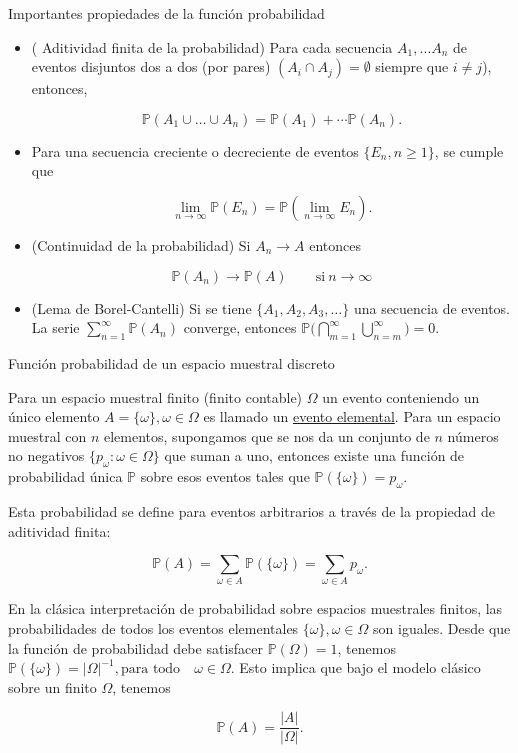 \documentclass{beamer}
\begin{document}
\begin{frame}{Importantes propiedades de la funci\'on  probabilidad}
	
	\begin{itemize}
\item \scriptsize{ ( Aditividad finita de la probabilidad) Para cada secuencia $A_1, \dots A_n$ de eventos disjuntos dos a dos (por pares) $(A_i \cap A_j) = \emptyset $ siempre que $i \neq j$), entonces,}


\[
\mathbb{P}(A_1 \cup \dots \cup A_n) = \mathbb{P}(A_1) + \cdots \mathbb{P}(A_n).
\]
\item \scriptsize{ Para una secuencia creciente o decreciente de eventos $\{E_n, n \geq 1 \}$, se cumple que}

\[
\lim_{n \rightarrow \infty}\mathbb{P}(E_n) = \mathbb{P}(\lim_{n \rightarrow \infty}E_n).
\]
\item \scriptsize{(Continuidad de la probabilidad) Si $A_n \rightarrow A $ entonces }

\[
\mathbb{P}(A_n) \rightarrow \mathbb{P}(A)  \qquad \mbox{si} \  n \rightarrow \infty
\]
\item \scriptsize{(Lema de Borel-Cantelli) Si se tiene  $\{ A_1, A_2, A_3, \dots \}$ una secuencia de eventos. La serie $\displaystyle \sum_{n =1}^{\infty}\mathbb{P}(A_n)$ converge, entonces} $\mathbb{P}\Biggl(\bigcap_{m =1}^{\infty}\bigcup_{n = m}^{\infty}\Biggr) = 0$.
\end{itemize}
\end{frame}

\begin{frame}{Funci\'on  probabilidad de un espacio muestral discreto}

\scriptsize{Para un espacio muestral finito (finito contable) $\Omega$ un evento conteniendo un \'unico elemento $A = \{\omega\}, \omega \in \Omega$ es llamado un \underline {evento elemental}. Para un espacio  muestral con $n$ elementos, supongamos que se nos da un conjunto de $n$ n\'umeros no negativos $\{ p_{\omega}: \omega \in \Omega\}$ que suman a uno, entonces existe  una funci\'on de probabilidad \'unica $\mathbb{P}$ sobre esos eventos tales que $\mathbb{P} (\{\omega\}) = p_{\omega}$.

Esta probabilidad se define para eventos arbitrarios a trav\'es de la propiedad de aditividad finita:

\[
\mathbb{P}(A)=\sum_{\omega\in A} \mathbb{P}(\{\omega\})=\sum_{\omega\in A} p_{\omega}.
\]

En la cl\'asica interpretaci\'on  de probabilidad sobre espacios  muestrales finitos, las probabilidades de todos los eventos elementales $\{ \omega\}, \omega \in \Omega$ son iguales. Desde que la funci\'on de probabilidad debe satisfacer $\mathbb{P}(\Omega) =  1$, tenemos $\mathbb{P}(\{\omega\})=\vert \Omega\vert^{-1}, \text{para todo}\quad \omega\in\Omega.$ Esto implica que bajo el modelo cl\'asico sobre un finito $\Omega$, tenemos

\[
\mathbb{P}(A)=\frac{\vert A\vert}{\vert \Omega\vert}.
\]

}
\end{frame}
\end{document}

